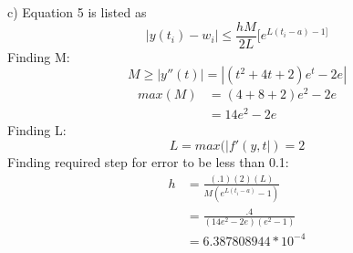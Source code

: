 \documentclass{article}
\begin{document}
\noindent
c) Equation 5 is listed as
$$
|y(t_i)-w_i| \leq \frac{hM}{2L}[e^{L(t_i-a)-1]}
$$
Finding M:
$$
M \geq |y''(t)|=|(t^2+4t+2)e^t-2e|
$$
$$
\begin{aligned}
	max(M) &= (4+8+2)e^2-2e
	\\&=14e^2-2e
\end{aligned}
$$
Finding L:
$$
L=max(|f'(y,t|)=2
$$
Finding required step for error to be less than 0.1:
$$
\begin{aligned}
	h&=\frac{(.1)(2)(L)}{M(e^{L(t_i-a)}-1)}
	\\&=\frac{.4}{(14e^2-2e)(e^2-1)}
	\\&=6.387808944*10^{-4}
\end{aligned}
$$
\end{document}
